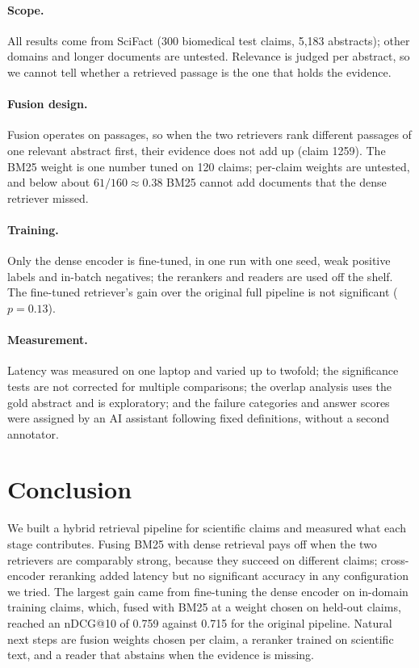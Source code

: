 \documentclass[runningheads]{llncs}
\begin{document}
\paragraph{Scope.} All results come from SciFact (300 biomedical test claims,
5{,}183 abstracts); other domains and longer documents are untested. Relevance is
judged per abstract, so we cannot tell whether a retrieved passage is the one that
holds the evidence.

\paragraph{Fusion design.} Fusion operates on passages, so when the two retrievers
rank different passages of one relevant abstract first, their evidence does not
add up (claim 1259). The BM25 weight is one number tuned on 120 claims; per-claim
weights are untested, and below about $61/160\approx0.38$ BM25 cannot add
documents that the dense retriever missed.

\paragraph{Training.} Only the dense encoder is fine-tuned, in one run with one
seed, weak positive labels and in-batch negatives; the rerankers and readers are
used off the shelf. The fine-tuned retriever's gain over the original full
pipeline is not significant ($p=0.13$).

\paragraph{Measurement.} Latency was measured on one laptop and varied up to
twofold; the significance tests are not corrected for multiple comparisons; the
overlap analysis uses the gold abstract and is exploratory; and the failure
categories and answer scores were assigned by an AI assistant following fixed
definitions, without a second annotator.

\section{Conclusion}
\label{sec:conclusion}

We built a hybrid retrieval pipeline for scientific claims and measured what
each stage contributes. Fusing BM25 with dense retrieval pays off when the two
retrievers are comparably strong, because they succeed on different claims;
cross-encoder reranking added latency but no significant accuracy in any
configuration we tried. The largest gain came from fine-tuning the dense encoder
on in-domain training claims, which, fused with BM25 at a weight chosen on
held-out claims, reached an nDCG@10 of 0.759 against 0.715 for the original
pipeline. Natural next steps are fusion weights chosen per claim, a reranker
trained on scientific text, and a reader that abstains when the evidence is
missing.
\end{document}
